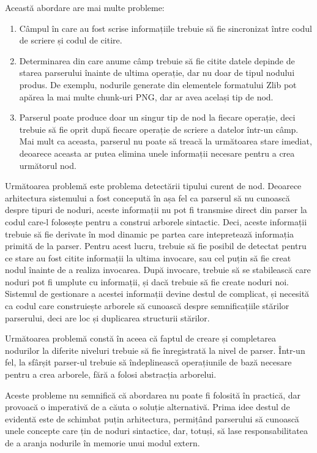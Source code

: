 \documentclass[a4paper,12pt]{report}
\begin{document}
Această abordare are mai multe probleme:
\begin{enumerate}
    \item
        Câmpul în care au fost scrise informațiile trebuie să fie sincronizat
        între codul de scriere și codul de citire.
    \item
        Determinarea din care anume câmp trebuie să fie citite datele
        depinde de starea parserului înainte de ultima operație,
        dar nu doar de tipul nodului produs.
        De exemplu, nodurile generate din elementele formatului Zlib pot apărea
        la mai multe chunk-uri \ac{PNG}, dar ar avea același tip de nod.
    \item
        Parserul poate produce doar un singur tip de nod la fiecare operație, deci trebuie
        să fie oprit după fiecare operație de scriere a datelor într-un câmp.
        Mai mult ca aceasta, parserul nu poate să treacă la următoarea stare imediat,
        deoarece aceasta ar putea elimina unele informații necesare pentru a crea următorul nod.
\end{enumerate}

Următoarea problemă este problema detectării tipului curent de nod.
Deoarece arhitectura sistemului a fost concepută în așa fel ca parserul să nu cunoască despre tipuri de noduri,
aceste informații nu pot fi transmise direct din parser la codul care-l folosește pentru
a construi arborele sintactic.
Deci, aceste informații trebuie să fie derivate în mod dinamic pe partea
care intepretează informația primită de la parser.
Pentru acest lucru, trebuie să fie posibil de detectat pentru ce stare au fost citite informații
la ultima invocare, sau cel puțin să fie creat nodul înainte de a realiza invocarea.
După invocare, trebuie să se stabilească care noduri pot fi umplute cu informații,
și dacă trebuie să fie create noduri noi.
Sistemul de gestionare a acestei informații devine destul de complicat,
și necesită ca codul care construiește arborele să cunoască despre semnificațiile stărilor parserului,
deci are loc și duplicarea structurii stărilor.

Următoarea problemă constă în aceea că faptul de creare
și completarea nodurilor la diferite niveluri trebuie să fie înregistrată la nivel de parser.
Într-un fel, la sfârșit parser-ul trebuie să îndeplinească operațiunile
de bază necesare pentru a crea arborele, fără a folosi abstracția arborelui.

Aceste probleme nu semnifică că abordarea nu poate fi folosită în practică,
dar provoacă o imperativă de a căuta o soluție alternativă.
Prima idee destul de evidentă este de schimbat puțin arhitectura,
permițând parserului să cunoască unele concepte care țin de noduri sintactice,
dar, totuși, să lase responsabilitatea de a aranja nodurile în memorie unui modul extern.
\end{document}
